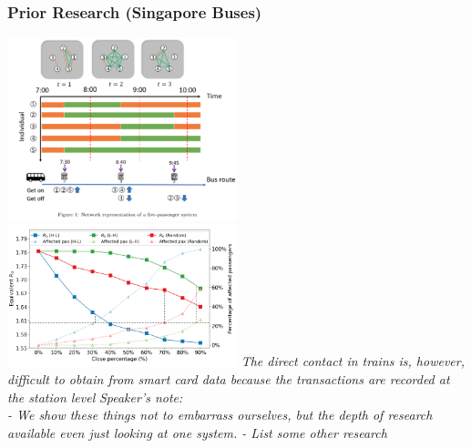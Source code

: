 \documentclass{beamer}
\begin{document}
\begin{frame}
\frametitle{Prior Research (Singapore Buses)}
\includegraphics[width=0.5\textwidth]{Singapore_1.png}%
\includegraphics[width=0.5\textwidth]{Singapore_2.png}
\textit{The direct contact in trains is, however, difficult to obtain from smart card data because the transactions are recorded at the station level}
\cite{singapore_bus_2020}
\textit{Speaker's note:\\
- We show these things not to embarrass ourselves, but the depth of research available even just looking at one system.
- List some other research
}
\end{frame}
\end{document}
